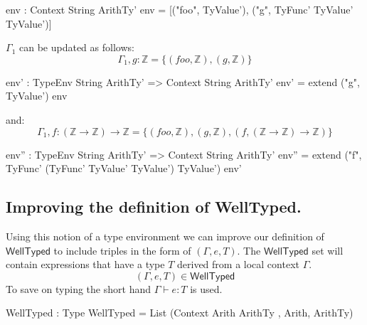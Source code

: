 \begin{code}
env : Context String ArithTy'
env = [("foo", TyValue'), ("g", TyFunc' TyValue' TyValue')]
\end{code}

\noindent
$\Gamma_{1}$ can be updated as follows:
\[
\Gamma_{1},g:\mathbb{Z} =\{(foo,\mathbb{Z}),(g,\mathbb{Z})\}
\]
\begin{code}
env' : TypeEnv String ArithTy' => Context String ArithTy'
env' = extend ("g", TyValue') env
\end{code}
\noindent
and:
\[
\Gamma_{1},f:(\mathbb{Z}\rightarrow\mathbb{Z})\rightarrow\mathbb{Z} =\{(foo,\mathbb{Z}),(g,\mathbb{Z}),(f,(\mathbb{Z}\rightarrow\mathbb{Z})\rightarrow\mathbb{Z})\}
\]
\begin{code}
env'' : TypeEnv String ArithTy' => Context String ArithTy'
env'' = extend ("f", TyFunc' (TyFunc' TyValue' TyValue')
                             TyValue')
               env'
\end{code}

\subsection{Improving the definition of \textsf{WellTyped}.}
\label{sec:types:example}

Using this notion of a type environment we can improve our definition of $\mathsf{WellTyped}$ to include triples in the form of $(\Gamma,e,T)$.
The $\mathsf{WellTyped}$ set will contain expressions that have a type $T$ derived from a local context $\Gamma$.
\[
(\Gamma,e,T)\in\mathsf{WellTyped}
\]
\noindent
To save on typing the short hand $\Gamma\vdash e:T$ is used.

\begin{code}
WellTyped : Type
WellTyped = List (Context Arith ArithTy , Arith, ArithTy)
\end{code}

